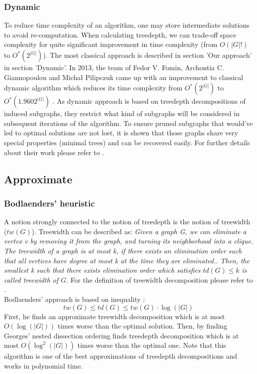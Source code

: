 \subsubsection{Dynamic}
To reduce time complexity of an algorithm, one may store intermediate solutions to avoid re-computation. When calculating treedepth, we can trade-off space complexity for quite significant improvement in time complexity (from $O\left(\left|G\right|!\right)$ to $O^{*}\left(2^{\left|G\right|}\right)$). The most classical approach is described in section 'Our approach' in section 'Dynamic'. In 2013, the team of Fedor V. Fomin, Archontia C. Giannopoulou and Michał Pilipczuk came up with an improvement to classical dynamic algorithm which reduces its time complexity from $O^{*}\left(2^{\left|G\right|}\right)$ to $O^{*}\left(1.9602^{\left|G\right|}\right)$ \cite{mimuw_td}. As dynamic approach is based on treedepth decompositions of induced subgraphs, they restrict what kind of subgraphs will be considered in subsequent iterations of the algorithm. To ensure pruned subgraphs that would've led to optimal solutions are not lost, it is shown that those graphs share very special properties (minimal trees) and can be recovered easily. For further details about their work please refer to \cite{mimuw_td}.
\newpage
\subsection{Approximate}
\subsubsection{Bodlaenders' heuristic \cite{bodlaender_td_approx}}
A notion strongly connected to the notion of treedepth is the notion of treewidth ($tw\left(G\right)$). Treewidth can be described as:
\emph{Given a graph G, we can eliminate a vertex v by removing it from the graph, and turning its neighborhood into a clique. The treewidth of a graph is at most k, if there exists an elimination order such that all vertices have degree at most k at the time they are eliminated.\cite{tw_gpu}. Then, the smallest k such that there exists elimination order which satisfies $td(G)\leq k$ is called treewidth of $G$}. For the definition of treewidth decomposition please refer to \cite{tw_decomp}.\\
Bodlaenders' approach is based on inequality \cite{mimuw_td}\cite{bodlaender_td_approx}:
\begin{equation}
tw(G) \leq td(G) \leq tw(G)\cdot \log\left(\left|G\right|\right)
\end{equation}
First, he finds an approximate treewidth decomposition which is at most $O\left(\log\left(\left|G\right|\right)\right)$ times worse than the optimal solution.
Then, by finding Georges' nested dissection ordering \cite{george}\cite{bodlaender_td_approx} finds treedepth decomposition which is at most $O\left(\log^2\left(\left|G\right|\right)\right)$ times worse than the optimal one. Note that this algorithm is one of the best approximations of treedepth decompositions and works in polynomial time.
